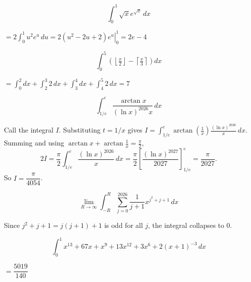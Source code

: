 \begin{questions}
\question \[ \int_0^1 \sqrt{x}e^{\sqrt{x}}\, dx \]
\begin{solution}
$= 2\displaystyle\int_0^1 u^2e^u\, du = \left.2(u^2-2u+2)e^u\right|_0^1 = 2e-4$
\end{solution}

\question \[ \int_0^5 \left(\left\lfloor \tfrac{x}{2}\right\rfloor - \left\lceil \tfrac{x}{3}\right\rceil\right) dx \]
\begin{solution}
$= \displaystyle\int_0^2 dx + \int_2^3 2\, dx + \int_3^4 dx + \int_4^5 2\, dx = 7$
\end{solution}

\question \[ \int_{1/e}^{e} \frac{\arctan x}{(\ln x)^{2026}x}\, dx \]
\begin{solution}
Call the integral $I$. Substituting $t=1/x$ gives $I=\displaystyle\int_{1/e}^e \arctan\left(\tfrac{1}{x}\right)\frac{(\ln x)^{2026}}{x}\, dx$. Summing and using $\arctan x+\arctan\tfrac{1}{x}=\tfrac{\pi}{2}$,
\[ 2I = \frac{\pi}{2}\int_{1/e}^e \frac{(\ln x)^{2026}}{x}\, dx = \frac{\pi}{2}\left[\frac{(\ln x)^{2027}}{2027}\right]_{1/e}^e = \frac{\pi}{2027}. \]
So $I=\dfrac{\pi}{4054}$.
\end{solution}

\question \[ \lim_{R\to\infty} \int_{-R}^{R} \sum_{j=0}^{2026} \frac{1}{j+1}x^{j^2+j+1}\, dx \]
\begin{solution}
Since $j^2+j+1=j(j+1)+1$ is odd for all $j$, the integral collapses to $0$.
\end{solution}

\question \[ \int_0^1 x^{13}+67x+x^9+13x^{12}+3x^6+2(x+1)^{-3}\, dx \]
\begin{solution}
$= \dfrac{5019}{140}$
\end{solution}

\end{questions}

